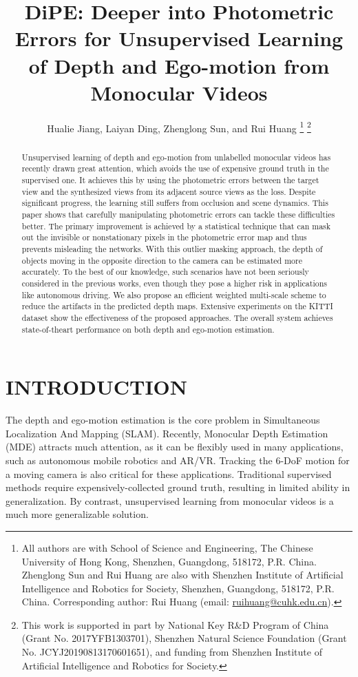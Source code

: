 \documentclass[letterpaper, 10 pt, conference]{ieeeconf}
\title{\LARGE \bf
DiPE: Deeper into Photometric Errors for Unsupervised Learning of Depth and Ego-motion from Monocular Videos}
\author{Hualie Jiang, Laiyan Ding, Zhenglong Sun, and Rui Huang 
\thanks{All authors are with School of Science and Engineering, The Chinese University of Hong Kong, Shenzhen, Guangdong, 518172, P.R. China. Zhenglong Sun and Rui Huang are also with Shenzhen Institute of Artificial Intelligence and Robotics for Society, Shenzhen, Guangdong, 518172, P.R. China. Corresponding author: Rui Huang (email: \href{mailto:ruihuang@cuhk.edu.cn}{ruihuang@cuhk.edu.cn}).} \thanks{This work is supported in part by National Key R\&D Program of China (Grant No. 2017YFB1303701), Shenzhen Natural Science Foundation (Grant No. JCYJ20190813170601651), and funding from Shenzhen Institute of Artificial Intelligence and Robotics for Society.
}}
\begin{document}
\maketitle
\thispagestyle{empty}
\pagestyle{empty}


\begin{abstract}

Unsupervised learning of depth and ego-motion from unlabelled monocular videos has recently drawn great
attention, which avoids the use of expensive ground truth in the supervised one.
It achieves this by using the photometric errors between the target view and the synthesized views from its adjacent source views as the loss. Despite significant progress, the learning still suffers from occlusion and scene dynamics. 
This paper shows that carefully manipulating photometric errors can tackle these difficulties better.
The primary improvement is achieved by a statistical technique that can mask out the invisible or nonstationary pixels in the photometric error map and thus prevents misleading the networks. 
With this outlier masking approach, the depth of objects moving in the opposite direction to the camera can be estimated more accurately.
To the best of our knowledge, such scenarios have not been seriously considered in the previous works, even though they pose a higher risk in applications like autonomous driving.
We also propose an efficient weighted multi-scale scheme to reduce the artifacts in the predicted depth maps. Extensive experiments on the KITTI dataset show the effectiveness of the proposed approaches.
The overall system achieves state-of-theart performance on both depth and ego-motion estimation.

\end{abstract}




\section{INTRODUCTION}
The depth and ego-motion estimation is the core problem in Simultaneous Localization And Mapping (SLAM). 
Recently, Monocular Depth Estimation (MDE) attracts much attention, as it can be flexibly used in many applications, such as autonomous mobile robotics and AR/VR. 
Tracking the 6-DoF motion for a moving camera is also critical for these applications. 
Traditional supervised methods require expensively-collected ground truth, resulting in limited ability in generalization. 
By contrast, unsupervised learning from monocular videos \cite{zhou2017unsupervised} is a much more generalizable solution. 
\end{document}

